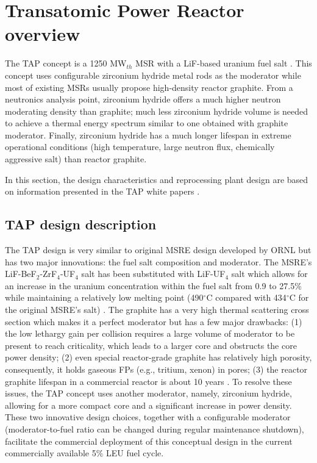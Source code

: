 \section{Transatomic Power Reactor overview}
The \gls{TAP} concept is a 1250 MW$_{th}$ \gls{MSR} with a LiF-based uranium fuel 
salt \cite{transatomic_power_corporation_technical_2016}. This concept uses 
configurable zirconium hydride metal rods as the moderator while most of existing 
\glspl{MSR} usually propose high-density reactor graphite. From a neutronics analysis 
point, zirconium hydride offers a much higher neutron moderating density than graphite;
much less zirconium hydride volume is needed to achieve a thermal energy spectrum 
similar to one obtained with graphite moderator. Finally, zirconium hydride has a much 
longer lifespan in extreme operational conditions (high temperature, large 
neutron flux, chemically aggressive salt) than reactor graphite.

In this section, the design characteristics and reprocessing plant design 
are based on information presented in the \gls{TAP} white papers \cite{transatomic_power_corporation_technical_2016, transatomic_power_corporation_neutronics_2016}.

\subsection{TAP design description}
The \gls{TAP} design is very similar to original \gls{MSRE} design developed 
by \gls{ORNL} \cite{haubenreich_experience_1970} but has two major innovations: 
the fuel salt composition and moderator. The \gls{MSRE}'s 
LiF-BeF$_2$-ZrF$_4$-UF$_4$ salt has been substituted with LiF-UF$_4$ salt which 
allows for an increase in the uranium concentration within the fuel salt from 0.9 to 
27.5\% while maintaining a relatively low melting point (490$^{\circ}$C compared 
with 434$^{\circ}$C for the original \gls{MSRE}'s salt) 
\cite{betzler_two-dimensional_2016}. The graphite has a very high 
thermal scattering cross section which makes it a perfect moderator but has 
a few major drawbacks: 
(1) the low lethargy gain per collision requires a large volume of moderator 
to be present to reach criticality, which leads to a larger core and obstructs 
the core power density; (2) even special 
reactor-grade graphite has relatively high porosity, consequently, it holds
gaseous \glspl{FP} 
(e.g., tritium, xenon) in pores; (3) the reactor graphite lifespan in a commercial 
reactor is about 10 years \cite{robertson_conceptual_1971}. To resolve these 
issues, the \gls{TAP} concept uses another 
moderator, namely, zirconium hydride, allowing for a more compact core and a 
significant increase in power density. These two innovative design choices,  
together with a configurable moderator 
(moderator-to-fuel ratio can be changed during regular maintenance shutdown), 
facilitate the commercial deployment of this conceptual design in the current 
commercially available 5\% \gls{LEU} fuel cycle. 

